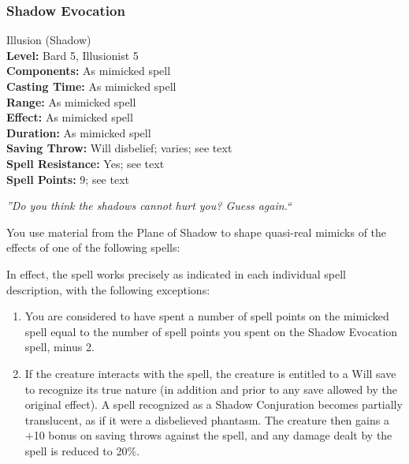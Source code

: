 \subsubsection{Shadow Evocation}
\label{Spell:ShadowEvocation}
Illusion (Shadow)
\\ \textbf{Level:} Bard 5, Illusionist 5
\\ \textbf{Components:} As mimicked spell
\\ \textbf{Casting Time:} As mimicked spell
\\ \textbf{Range:} As mimicked spell
\\ \textbf{Effect:} As mimicked spell
\\ \textbf{Duration:} As mimicked spell
\\ \textbf{Saving Throw:} Will disbelief; varies; see text
\\ \textbf{Spell Resistance:} Yes; see text
\\ \textbf{Spell Points:} 9; see text

\emph{''Do you think the shadows cannot hurt you? Guess again.``}

You use material from the Plane of Shadow to shape quasi-real mimicks of the effects of one of the following spells:
\begin{list}{}{\leftmargin=1em}
 \item {}
 \item {}
 \item {} 
 \item {}
 \item {}
 \item {}
 \item {}
 \item {}
 \item {}
 \item {}
\end{list}
In effect, the spell works precisely as indicated in each individual spell description, with the following exceptions:
\begin{enumerate}
 \item You are considered to have spent a number of spell points on the mimicked spell equal to the number of spell
 points you spent on the Shadow Evocation spell, minus 2.
 \item If the creature interacts with the spell, the creature is entitled to a Will save to recognize its true nature (in addition and prior to
 any save allowed by the original effect).
 A spell recognized as a Shadow Conjuration becomes partially translucent, as if it were a disbelieved phantasm.
 The creature then gains a +10 bonus on saving throws against the spell, and any damage dealt by the spell is reduced to 20\%.
\end{enumerate}

